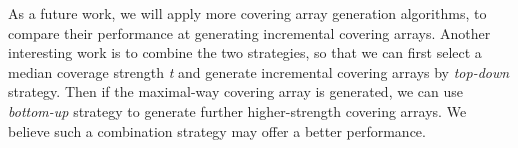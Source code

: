 \documentclass[conference]{IEEEtran}
\theoremstyle{definition}
\begin{document}
As a future work, we will apply more covering array generation algorithms, to compare their performance at generating incremental covering arrays. Another interesting work is to combine the two strategies, so that we can first select a median coverage strength \emph{t} and generate incremental covering arrays by \emph{top-down} strategy. Then if the maximal-way covering array is generated, we can use \emph{bottom-up} strategy to generate further higher-strength covering arrays. We believe such a combination strategy may offer a better performance.
%
%



%
%
\end{document}
